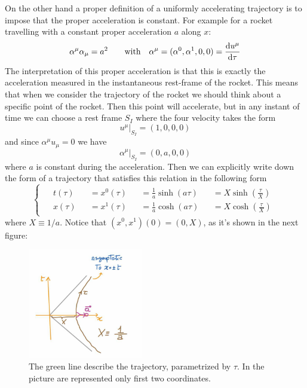 \documentclass[../main/main.tex]{subfiles}
\begin{document}
On the other hand a proper definition of a uniformly accelerating trajectory is to impose that the proper acceleration is constant. For example for a rocket travelling with a constant proper acceleration $a$ along $ x$:
\[\alpha^\mu\alpha_\mu=a^2\qquad\text{with}\quad \alpha^\mu=(\alpha^0,\alpha^1,0,0)=\frac{\textup{d} u^\mu}{\textup{d}\tau}\]
The interpretation of this proper acceleration is that this is exactly the acceleration measured in the instantaneous rest-frame of the rocket. This means that when we consider the trajectory of the rocket we should think about a specific point of the rocket. Then this point will accelerate, but in any instant of time we can choose a rest frame $S_I$ where the four velocity takes the form
\[u^\mu\vert_{S_I}=(1,0,0,0)\]
and since $\alpha^\mu u_\mu=0$ we have
\[\alpha^\mu|_{S_I}=(0,a,0,0)\]
where $a$ is constant during the acceleration. 
%
Then we can explicitly write down the form of a trajectory that satisfies this relation in the following form
\begin{equation}\label{eqn:const-accell-solut}\begin{cases}\begin{alignedat}{4}
&t(\tau)&&=x^0(\tau)&&=\frac1a\sinh(a\tau)&&=X\sinh(\frac\tau X)\\
&x(\tau)&&=x^1(\tau)&&=\frac1a\cosh(a\tau)&&=X\cosh(\frac\tau X)
\end{alignedat}\end{cases}\end{equation}
where $X\equiv1/a$. Notice that $(x^0,x^1)(0)=(0,X)$, as it's shown in the next figure:

\begin{figure}[H]
\centering
\includegraphics[width=5cm]{../img/const-accel-traject.jpg}
\caption{The green line describe the trajectory, parametrized by $\tau$. In the picture are represented only first two coordinates.}
\end{figure}
\end{document}
